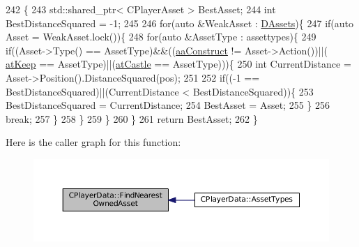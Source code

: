 \begin{DoxyCode}
242                                                                                                            
                       \{
243     std::shared\_ptr< CPlayerAsset > BestAsset;
244     \textcolor{keywordtype}{int} BestDistanceSquared = -1;
245 
246     \textcolor{keywordflow}{for}(\textcolor{keyword}{auto} &WeakAsset : \hyperlink{classCPlayerData_a1d7dd355facf52db6242e3554373906c}{DAssets})\{
247         \textcolor{keywordflow}{if}(\textcolor{keyword}{auto} Asset = WeakAsset.lock())\{
248             \textcolor{keywordflow}{for}(\textcolor{keyword}{auto} &AssetType : assettypes)\{
249                 \textcolor{keywordflow}{if}((Asset->Type() == AssetType)&&((\hyperlink{GameDataTypes_8h_ab47668e651a3032cfb9c40ea2d60d670a7ef6b863f66dd7dcc95a199cd758ae1d}{aaConstruct} != Asset->Action())||(
      \hyperlink{GameDataTypes_8h_a5600d4fc433b83300308921974477fecaaed39451bedb0392ad95fbc9c95bef31}{atKeep} == AssetType)||(\hyperlink{GameDataTypes_8h_a5600d4fc433b83300308921974477feca6727b47855e74f3f7b6e4a96d0c2a42a}{atCastle} == AssetType)))\{
250                     \textcolor{keywordtype}{int} CurrentDistance = Asset->Position().DistanceSquared(pos);
251                     
252                     \textcolor{keywordflow}{if}((-1 == BestDistanceSquared)||(CurrentDistance < BestDistanceSquared))\{
253                         BestDistanceSquared = CurrentDistance;
254                         BestAsset = Asset;
255                     \}
256                     \textcolor{keywordflow}{break};
257                 \}
258             \}
259         \}
260     \}
261     \textcolor{keywordflow}{return} BestAsset;
262 \}
\end{DoxyCode}
Here is the caller graph for this function\+:
\nopagebreak
\begin{figure}[H]
\begin{center}
\leavevmode
\includegraphics[width=350pt]{classCPlayerData_a53c9e046c6f43fd83a0feb32b4fe999d_icgraph}
\end{center}
\end{figure}
\hypertarget{classCPlayerData_a45b5ba15a17796acdbaca7eacc7532d0}{}\label{classCPlayerData_a45b5ba15a17796acdbaca7eacc7532d0} 

